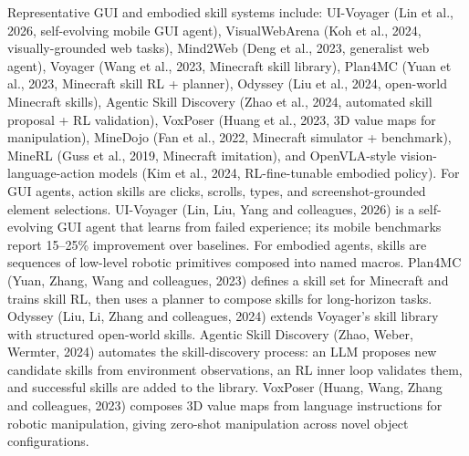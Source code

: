 Representative GUI and embodied skill systems include: UI-Voyager (Lin et al., 2026, self-evolving mobile GUI agent), VisualWebArena (Koh et al., 2024, visually-grounded web tasks), Mind2Web (Deng et al., 2023, generalist web agent), Voyager (Wang et al., 2023, Minecraft skill library), Plan4MC (Yuan et al., 2023, Minecraft skill RL + planner), Odyssey (Liu et al., 2024, open-world Minecraft skills), Agentic Skill Discovery (Zhao et al., 2024, automated skill proposal + RL validation), VoxPoser (Huang et al., 2023, 3D value maps for manipulation), MineDojo (Fan et al., 2022, Minecraft simulator + benchmark), MineRL (Guss et al., 2019, Minecraft imitation), and OpenVLA-style vision-language-action models (Kim et al., 2024, RL-fine-tunable embodied policy). For GUI agents, action skills are clicks, scrolls, types, and screenshot-grounded element selections. UI-Voyager (Lin, Liu, Yang and colleagues, 2026) is a self-evolving GUI agent that learns from failed experience; its mobile benchmarks report 15--25\% improvement over baselines. For embodied agents, skills are sequences of low-level robotic primitives composed into named macros. Plan4MC (Yuan, Zhang, Wang and colleagues, 2023) defines a skill set for Minecraft and trains skill RL, then uses a planner to compose skills for long-horizon tasks. Odyssey (Liu, Li, Zhang and colleagues, 2024) extends Voyager's skill library with structured open-world skills. Agentic Skill Discovery (Zhao, Weber, Wermter, 2024) automates the skill-discovery process: an LLM proposes new candidate skills from environment observations, an RL inner loop validates them, and successful skills are added to the library. VoxPoser (Huang, Wang, Zhang and colleagues, 2023) composes 3D value maps from language instructions for robotic manipulation, giving zero-shot manipulation across novel object configurations.

